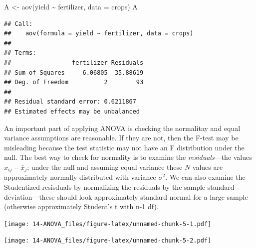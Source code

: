 \documentclass[
]{book}
\newenvironment{Shaded}{\begin{snugshade}}{\end{snugshade}}
\newcommand{\AttributeTok}[1]{\textcolor[rgb]{0.77,0.63,0.00}{#1}}
\newcommand{\FunctionTok}[1]{\textcolor[rgb]{0.00,0.00,0.00}{#1}}
\newcommand{\NormalTok}[1]{#1}
\newcommand{\OtherTok}[1]{\textcolor[rgb]{0.56,0.35,0.01}{#1}}
\newcommand{\SpecialCharTok}[1]{\textcolor[rgb]{0.00,0.00,0.00}{#1}}
\begin{document}
\begin{Shaded}
\begin{Highlighting}[]
\NormalTok{A }\OtherTok{\textless{}{-}} \FunctionTok{aov}\NormalTok{(yield }\SpecialCharTok{\textasciitilde{}}\NormalTok{ fertilizer, }\AttributeTok{data =}\NormalTok{ crops)}
\NormalTok{A}
\end{Highlighting}
\end{Shaded}

\begin{verbatim}
## Call:
##    aov(formula = yield ~ fertilizer, data = crops)
## 
## Terms:
##                 fertilizer Residuals
## Sum of Squares     6.06805  35.88619
## Deg. of Freedom          2        93
## 
## Residual standard error: 0.6211867
## Estimated effects may be unbalanced
\end{verbatim}

An important part of applying ANOVA is checking the normalitay and equal variance assumptions are reasonable. If they are not, then the F-test may be misleading because the test statistic may not have an F distribution under the null. The best way to check for normality is to examine the \emph{residuals}---the values \(x_{ij} - \overline x_{j}\); under the null and assuming equal variance these \(N\) values are approximately normally distributed with variance \(\sigma^2\). We can also examine the Studentized resisduals by normalizing the residuals by the sample standard deviation---these should look approximately standard normal for a large sample (otherwise approximately Student's t with n-1 df).

\begin{Shaded}
\end{Shaded}

\texttt{[image: 14-ANOVA\_files/figure-latex/unnamed-chunk-5-1.pdf]}

\begin{Shaded}
\end{Shaded}

\texttt{[image: 14-ANOVA\_files/figure-latex/unnamed-chunk-5-2.pdf]}
\end{document}
